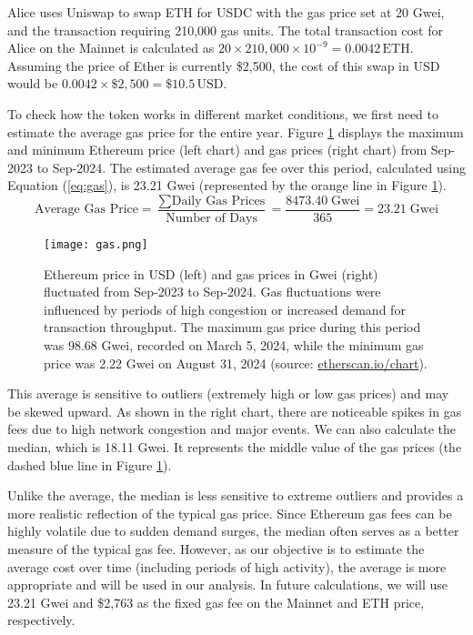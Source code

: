 \begin{example}
	Alice uses Uniswap to swap ETH for USDC with the gas price set at 20 Gwei, and the transaction requiring 210,000 gas units. The total transaction cost for Alice on the Mainnet is calculated as \(20 \times 210,000 \times 10^{-9} = 0.0042 \, \text{ETH}\). Assuming the price of Ether is currently \$2,500, the cost of this swap in USD would be \(0.0042 \times \$2,500 = \$10.5 \, \text{USD}\).
\end{example}

To check how the token works in different market conditions, we first need to estimate the average gas price for the entire year. Figure \ref{fig:gas} displays the maximum and minimum Ethereum price (left chart) and gas prices (right chart) from Sep-2023 to Sep-2024. The estimated average gas fee over this period, calculated using Equation (\ref{eq:gas}), is 23.21 Gwei (represented by the orange line in Figure \ref{fig:gas}).
\small{
	\begin{equation}\label{eq:gas}
		\text{Average Gas Price} = \frac{\sum \text{Daily Gas Prices}}{\text{Number of Days}} = \frac{8473.40\; \text{Gwei}}{365} = 23.21\; \text{Gwei}
	\end{equation}
}\normalsize

\begin{figure}[t]
	\texttt{[image: gas.png]}
	\caption[Ethereum price and gas fluctuations]{Ethereum price in USD (left) and gas prices in Gwei (right) fluctuated from Sep-2023 to Sep-2024. Gas fluctuations were influenced by periods of high congestion or increased demand for transaction throughput. The maximum gas price during this period was 98.68 Gwei, recorded on March 5, 2024, while the minimum gas price was 2.22 Gwei on August 31, 2024 (source: \url{etherscan.io/chart}).}
	\label{fig:gas}
\end{figure}

This average is sensitive to outliers (extremely high or low gas prices) and may be skewed upward. As shown in the right chart, there are noticeable spikes in gas fees due to high network congestion and major events. We can also calculate the median, which is 18.11 Gwei. It represents the middle value of the gas prices (the dashed blue line in Figure \ref{fig:gas}). 

Unlike the average, the median is less sensitive to extreme outliers and provides a more realistic reflection of the typical gas price. Since Ethereum gas fees can be highly volatile due to sudden demand surges, the median often serves as a better measure of the typical gas fee. However, as our objective is to estimate the average cost over time (including periods of high activity), the average is more appropriate and will be used in our analysis. In future calculations, we will use 23.21 Gwei and \$2,763 as the fixed gas fee on the Mainnet and ETH price, respectively. 

